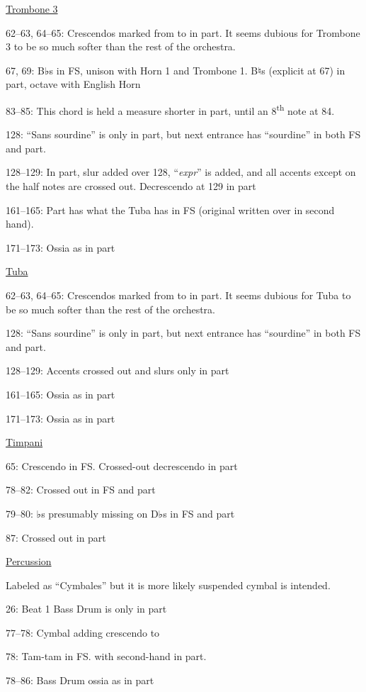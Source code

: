 \documentclass[twoside]{article}
\newcommand\dynmark[1]{\scalebox{0.9}{#1}{\kern1pt}}
\begin{document}
\begin{hangparas}{15pt}{1}
\begin{multicols}{2}
\underline{Trombone 3}

62--63, 64--65: Crescendos marked from \dynmark{\pp} to \dynmark{\p} in part. It seems dubious for Trombone 3 to be so much softer than the rest of the orchestra.

67, 69: B♭s in FS, unison with Horn 1 and Trombone 1. B♮s (explicit at 67) in part, octave with English Horn

83--85: This chord is held a measure shorter in part, until an 8\textsuperscript{th} note at 84.

128: ``Sans sourdine'' is only in part, but next entrance has ``sourdine'' in both FS and part.

128--129: In part, slur added over 128, ``\textit{expr}'' is added, and all accents except on the half notes are crossed out. Decrescendo at 129 in part

161--165: Part has what the Tuba has in FS (original written over in second hand).

171--173: Ossia as in part

\underline{Tuba}

62--63, 64--65: Crescendos marked from \dynmark{\p} to \dynmark{\mezzopiano} in part. It seems dubious for Tuba to be so much softer than the rest of the orchestra.

128: ``Sans sourdine'' is only in part, but next entrance has ``sourdine'' in both FS and part.

128--129: Accents crossed out and slurs only in part

161--165: Ossia as in part

171--173: Ossia as in part

\underline{Timpani}

65: Crescendo in FS. Crossed-out decrescendo in part

78--82: Crossed out in FS and part

79--80: ♭s presumably missing on D♭s in FS and part

87: Crossed out in part

\underline{Percussion}

Labeled as ``Cymbales'' but it is more likely suspended cymbal is intended.

26: Beat 1 Bass Drum is only in part

77--78: Cymbal adding crescendo to \dynmark{\ff}

78: Tam-tam \dynmark{\p} in FS. \dynmark{\f} with second-hand \dynmark{\fff} in part.

78--86: Bass Drum ossia as in part


\end{multicols}
\end{hangparas}
\end{document}
